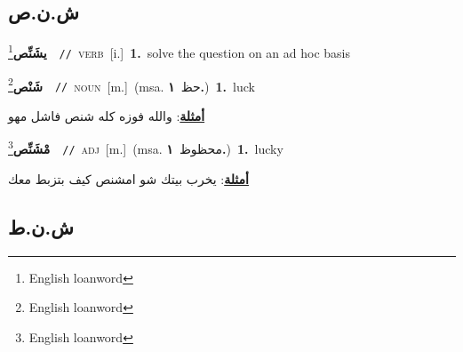 \documentclass[10pt,a4paper,twoside]{article} %
\begin{document}
\begin{multicols}{2}
\vspace{-3mm}
\subsection*{\color{blue}\foreignlanguage{arabic}{ش.ن.ص}\color{blue}{ (ntws)}} 

{\setlength\topsep{0pt}\textbf{\foreignlanguage{arabic}{يشَنِّص}}\footnote{English loanword}\ \ {\color{gray}\texttt{//}\color{black}}\ \textsc{verb}\ [i.]\ \textbf{1.}~solve the question on an ad hoc basis\ } \vspace{2mm}

{\setlength\topsep{0pt}\textbf{\foreignlanguage{arabic}{شَنْص}}\footnote{English loanword}\ \ {\color{gray}\texttt{//}\color{black}}\ \textsc{noun}\ [m.]\ \color{gray}(msa. \foreignlanguage{arabic}{حظ}~\foreignlanguage{arabic}{\textbf{١.}})\color{black}\ \textbf{1.}~luck\  \begin{flushright}\color{gray}\foreignlanguage{arabic}{\textbf{\underline{\foreignlanguage{arabic}{أمثلة}}}: والله فوزه كله شنص فاشل مهو}\end{flushright}\color{black}} \vspace{2mm}

{\setlength\topsep{0pt}\textbf{\foreignlanguage{arabic}{مْشَنِّص}}\footnote{English loanword}\ \ {\color{gray}\texttt{//}\color{black}}\ \textsc{adj}\ [m.]\ \color{gray}(msa. \foreignlanguage{arabic}{محظوظ}~\foreignlanguage{arabic}{\textbf{١.}})\color{black}\ \textbf{1.}~lucky\  \begin{flushright}\color{gray}\foreignlanguage{arabic}{\textbf{\underline{\foreignlanguage{arabic}{أمثلة}}}: يخرب بيتك شو امشنص كيف بتزبط معك}\end{flushright}\color{black}} \vspace{2mm}

\vspace{-3mm}
\subsection*{\color{blue}\foreignlanguage{arabic}{ش.ن.ط}\color{blue}{}} 


\end{multicols}
\end{document}
